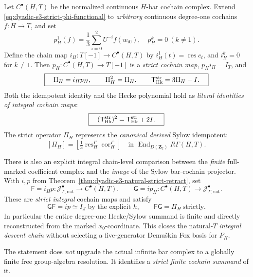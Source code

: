 \begin{theorem}
\label{thm:dyadic-s3-strict-bar-hecke-projector}
Let $C^\bullet(H,T)$ be the
normalized continuous $H$-bar
cochain complex.  Extend
\eqref{eq:dyadic-s3-strict-phi-functional}
to \emph{arbitrary} continuous
degree-one cochains
$f:H\to T$, and set
\[
p_H^1(f)=\frac13\sum_{i=0}^{2}
U^{-i}f(w_{i0}),\quad
p_H^k=0\ (k\ne1).
\]
Define the chain map
$i_H:T[-1]\to C^\bullet(H,T)$
by $i_H^1(t)=\operatorname{res}c_t$,
and $i_H^k=0$ for $k\ne1$.
Then $p_H:C^\bullet(H,T)\to T[-1]$
is a \emph{strict cochain map},
$p_Hi_H=I_T$, and
\begin{equation}\label{eq:dyadic-s3-strict-bar-projector}
\boxed{\quad
\Pi_H=i_Hp_H,\qquad
\Pi_H^2=\Pi_H,\qquad
\mathsf T_{\rm Hk}^{\rm str}=3\Pi_H-I.
\quad}
\end{equation}
Both the idempotent identity
and the Hecke polynomial hold
as \emph{literal identities of
integral cochain maps}:
\begin{equation}\label{eq:dyadic-s3-strict-bar-hecke-polynomial}
\boxed{\quad
(\mathsf T_{\rm Hk}^{\rm str})^2
=\mathsf T_{\rm Hk}^{\rm str}+2I.
\quad}
\end{equation}
The strict operator
$\Pi_H$ represents the
\emph{canonical derived}
Sylow idempotent:
\begin{equation}\label{eq:dyadic-s3-bar-derived-equality}
[\Pi_H]=
\left[
\tfrac13\operatorname{res}_H^\Gamma
\operatorname{cor}_H^\Gamma
\right]
\quad
\text{in }
\operatorname{End}_{D(\mathbf Z_2)}
R\Gamma(H,T).
\end{equation}

There is also an explicit
integral chain-level comparison
between the \emph{finite}
full-marked coefficient
complex and the \emph{image}
of the Sylow bar-cochain
projector.  With $i,p$ from
Theorem~\ref{thm:dyadic-s3-natural-strict-retract},
set
\begin{equation}\label{eq:dyadic-s3-marked-to-sylow-chain-maps}
\mathsf F=i_Hp:
\mathcal J^\bullet_{\Gamma,\mathrm{nat}}
\longrightarrow C^\bullet(H,T),
\qquad
\mathsf G=i p_H:
C^\bullet(H,T)
\longrightarrow\mathcal J^\bullet_{\Gamma,\mathrm{nat}}.
\end{equation}
These are \emph{strict integral}
cochain maps and satisfy
\begin{equation}\label{eq:dyadic-s3-marked-to-sylow-composites}
\boxed{\quad
\mathsf G\mathsf F=i p
\simeq I_{\mathcal J}
\ \text{by the explicit }h,
\qquad
\mathsf F\mathsf G=\Pi_H
\ \text{strictly}.
\quad}
\end{equation}
In particular the entire
degree-one Hecke/Sylow
summand is finite and
directly reconstructed from
the marked $x_0$-coordinate.
This closes the natural-$T$
\emph{integral descent chain}
without selecting a
five-generator Demu\v{s}kin
Fox basis for $P_H$.

The statement does \emph{not}
upgrade the actual infinite
bar complex to a globally
finite free group-algebra
resolution.  It identifies
a \emph{strict finite
cochain summand} of it.
\end{theorem}

